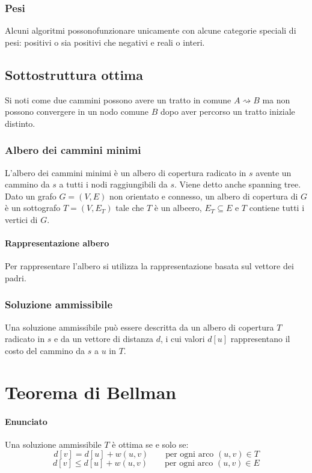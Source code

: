 \subsubsection{Pesi}
Alcuni algoritmi possonofunzionare unicamente con alcune categorie speciali di pesi: positivi o sia positivi che negativi e reali o interi.
\subsection{Sottostruttura ottima}
Si noti come due cammini possono avere un tratto in comune $A\rightsquigarrow B$ ma non possono convergere in un nodo comune $B$ dopo aver percorso un tratto iniziale distinto. 
\subsubsection{Albero dei cammini minimi}
L'albero dei cammini minimi \`e un albero di copertura radicato in $s$ avente un cammino da $s$ a tutti i nodi raggiungibili da $s$. Viene detto anche spanning tree. Dato un grafo $G=
(V, E)$ non orientato e connesso, un albero di copertura di $G$ \`e un sottografo $T=(V, E_T)$ tale che $T$ \`e un albeero, $E_T\subseteq E$ e $T$ contiene tutti i vertici di $G$. 
\paragraph{Rappresentazione albero}
Per rappresentare l'albero si utilizza la rappresentazione basata sul vettore dei padri.
\subsubsection{Soluzione ammissibile}
Una soluzione ammissibile pu\`o essere descritta da un albero di copertura $T$ radicato in $s$ e da un vettore di distanza $d$, i cui valori $d[u]$ rappresentano il costo del cammino da
$s$ a $u$ in $T$.\\

\section{Teorema di Bellman}
\paragraph{Enunciato}
Una soluzione ammissibile $T$ \`e ottima se e solo se: $$d[v] = d[u]+w(u, v) \quad\quad \text{per ogni arco }(u, v)\in T$$ $$d[v] \le d[u]+w(u, v) \quad\quad \text{per ogni arco }(u, v)
\in E$$
